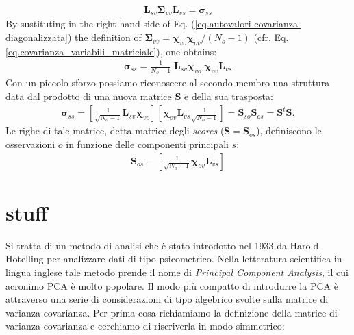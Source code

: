 \documentclass[11pt]{amsart}
\begin{document}
%
\begin{eqnarray}
\label{eq.autovalori-covarianza-diagonalizzata}
\bm L_{sv} \bm \Sigma_{vv} \bm L_{vs}
=
\bm \sigma_{ss}
\end{eqnarray}
%
By sustituting in the right-hand side of Eq. (\ref{eq.autovalori-covarianza-diagonalizzata}) the definition of $\bm \Sigma_{vv} = \bm \chi_{vo} \bm \chi_{ov} / (N_o-1)$ (cfr. Eq. \ref{eq.covarianza_variabili_matriciale}), one obtains:
%
\begin{eqnarray}
\bm \sigma_{ss} =
\frac{1}{N_o - 1} \; \bm L_{sv} \bm \chi_{vo} \; \bm \chi_{ov} \bm L_{vs} 
\end{eqnarray}
%
Con un piccolo sforzo possiamo riconoscere al secondo membro una struttura data dal prodotto di una nuova matrice $\bm S$ e della sua trasposta:
%
\begin{eqnarray}
\bm \sigma_{ss}
=
\left[ \frac{1}{\sqrt{N_o - 1}} \bm L_{sv} \bm \chi_{vo} \right]
\left[ \bm \chi_{ov} \bm L_{vs} \frac{1}{\sqrt{N_o - 1}} \right] 
=
\bm S_{so} \bm S_{os}
=
\bm S^t \bm S.
\end{eqnarray}
%
Le righe di tale matrice, detta matrice degli {\em scores} ($\bm S = \bm S_{os}$), definiscono le  osservazioni $o$ in funzione delle componenti principali $s$:
%
\begin{eqnarray}
\label{eq.scores}
\bm S_{os} \equiv \left[ \frac{1}{\sqrt{N_o - 1}} \bm \chi_{ov} \bm L_{vs} \right]
\end{eqnarray}










\section{stuff}
Si tratta di un metodo di analisi che è stato introdotto nel 1933 da Harold Hotelling \cite{Hotelling1933} per analizzare dati di tipo psicometrico. Nella letteratura scientifica in lingua inglese tale metodo prende il nome di {\em Principal Component Analysis}, il cui acronimo PCA è molto popolare. Il modo più compatto di introdurre la PCA è attraverso una serie di considerazioni di tipo algebrico svolte sulla matrice di varianza-covarianza.
%
Per prima cosa richiamiamo la definizione della matrice di varianza-covarianza e cerchiamo di riscriverla in modo simmetrico:
\end{document}
